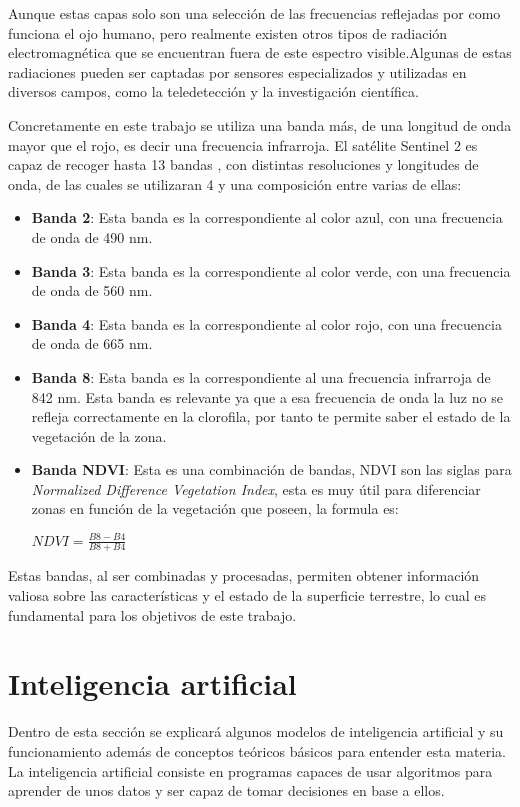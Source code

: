 Aunque estas capas solo son una selección de las frecuencias reflejadas por como funciona el ojo humano, pero realmente existen otros tipos de radiación electromagnética que se encuentran fuera de este espectro visible.Algunas de estas radiaciones pueden ser captadas por sensores especializados y utilizadas en diversos campos, como la teledetección y la investigación científica.

Concretamente en este trabajo se utiliza una banda más, de una longitud de onda mayor que el rojo, es decir una frecuencia infrarroja. El satélite Sentinel 2 es capaz de recoger hasta 13 bandas \cite{gisgeographySentinelBands}, con distintas resoluciones y longitudes de onda, de las cuales se utilizaran 4 y una composición entre varias de ellas:
 \begin{itemize}
	\item\textbf{Banda 2}: Esta banda es la correspondiente al color azul, con una frecuencia de onda de 490 nm.
	
	\item\textbf{Banda 3}: Esta banda es la correspondiente al color verde, con una frecuencia de onda de 560 nm.
	
	\item\textbf{Banda 4}: Esta banda es la correspondiente al color rojo, con una frecuencia de onda de 665 nm.
	
	\item\textbf{Banda 8}: Esta banda es la correspondiente al una frecuencia infrarroja de 842 nm. Esta banda es relevante ya que a esa frecuencia de onda la luz no se refleja correctamente en la clorofila, por tanto te permite saber el estado de la vegetación de la zona.
	
	\item\textbf{Banda NDVI}: Esta es una combinación de bandas, NDVI son las siglas para \textit{Normalized Difference Vegetation Index}, esta es muy útil para diferenciar zonas en función de la vegetación que poseen, la formula es: 
	
	\begin{math}
	NDVI=\frac{B8-B4}{B8+B4}
	\end{math}
	
\end{itemize}

 Estas bandas, al ser combinadas y procesadas, permiten obtener información valiosa sobre las características y el estado de la superficie terrestre, lo cual es fundamental para los objetivos de este trabajo.
 
\section{Inteligencia artificial}
Dentro de esta sección se explicará algunos modelos de inteligencia artificial y su funcionamiento además de conceptos teóricos básicos para entender esta materia.
La inteligencia artificial \cite{rouhiainen2018inteligencia} consiste en programas capaces de usar algoritmos para aprender de unos datos y ser capaz de tomar decisiones en base a ellos.

